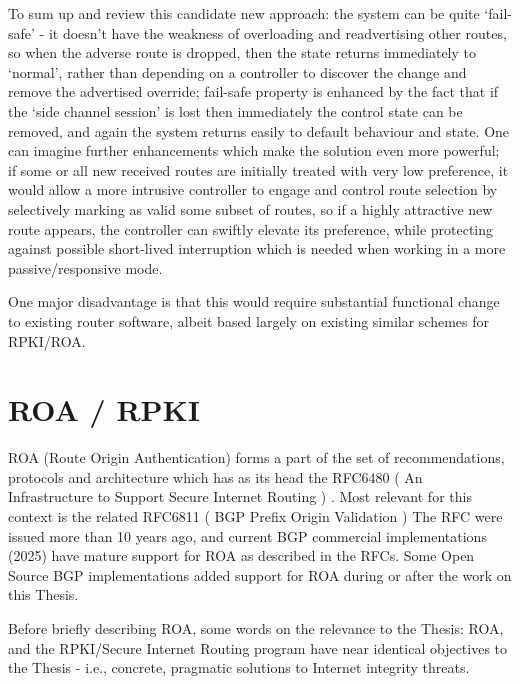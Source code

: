 To sum up and review this candidate new approach:
the system can be quite `fail-safe' - it doesn't have the weakness of overloading and readvertising other routes, so when the adverse route is dropped, then the state returns immediately to `normal', rather than depending on a controller to discover the change and remove the advertised override;
fail-safe property is enhanced by the fact that if the `side channel session' is lost then immediately the control state can be removed, and again the system returns easily to default behaviour and state.
One can imagine further enhancements which make the solution even more powerful; if some or all new received routes are initially treated with very low preference, it would allow a more intrusive controller to engage and control route selection by selectively marking as valid some subset of routes, so if a highly attractive new route appears, the controller can swiftly elevate its preference, while protecting against possible short-lived interruption which is needed when working in a more passive/responsive mode.

One major disadvantage is that this would require substantial functional change to existing router software, albeit based largely on existing similar schemes for RPKI/ROA.


\section{ROA / RPKI}

ROA (Route Origin Authentication) forms a part of the set of recommendations, protocols and architecture which has as its head the RFC6480 ( An Infrastructure to Support Secure Internet Routing )  \cite{rfc6480}.  Most relevant for this context is the related RFC6811 ( BGP Prefix Origin Validation ) \cite{rfc6811}
The RFC were issued more than 10 years ago, and current BGP commercial implementations (2025) have mature support for ROA as described in the RFCs.  Some Open Source BGP implementations added support for ROA during or after the work on this Thesis.

Before briefly describing ROA, some words on the relevance to the Thesis:
ROA, and the RPKI/Secure Internet Routing program have near identical objectives to the Thesis - i.e., concrete, pragmatic solutions to Internet integrity threats.

